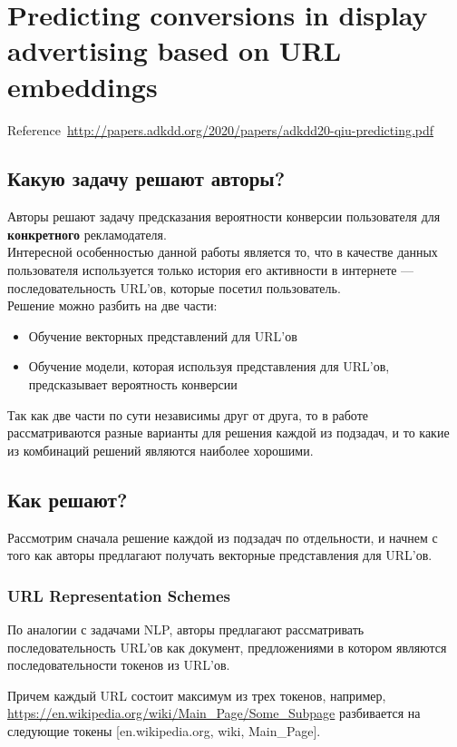 \chapter{Predicting conversions in display advertising based on URL embeddings}
Reference~\url{http://papers.adkdd.org/2020/papers/adkdd20-qiu-predicting.pdf}

\section{Какую задачу решают авторы?}

Авторы решают задачу предсказания вероятности конверсии пользователя для \textbf{конкретного} рекламодателя. \\

Интересной особенностью данной работы является то, что в качестве данных пользователя используется только история его активности в интернете --- последовательность URL'ов, которые посетил пользователь. \\

Решение можно разбить на две части:
\begin{itemize}
    \item Обучение векторных представлений для URL'ов
    \item Обучение модели, которая используя представления для URL'ов, предсказывает вероятность конверсии
\end{itemize}

Так как две части по сути независимы друг от друга, то в работе рассматриваются разные варианты для решения каждой из подзадач, и то какие из комбинаций решений являются наиболее хорошими.

\section{Как решают?}

Рассмотрим сначала решение каждой из подзадач по отдельности, и начнем с того как авторы предлагают получать векторные представления для URL'ов.

\subsection{URL Representation Schemes}

По аналогии с задачами NLP, авторы предлагают рассматривать последовательность URL'ов как документ, предложениями в котором являются последовательности токенов из URL'ов.

Причем каждый URL состоит максимум из трех токенов, например, \url{https://en.wikipedia.org/wiki/Main_Page/Some\_Subpage} разбивается на следующие токены
  [en.wikipedia.org, wiki, Main\_Page]. \\

